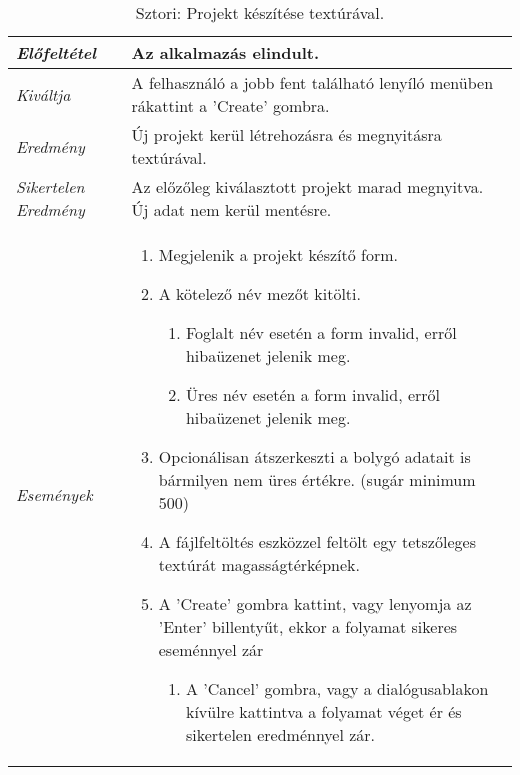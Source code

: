 \begin{table}[H]
	\centering
	\begin{tabular}{ | m{} | m{} | }
		\hline
		\emph{Előfeltétel} & Az alkalmazás elindult.  \\
		\hline
		\emph{Kiváltja} & A felhasználó a jobb fent található lenyíló menüben rákattint a 'Create' gombra. \\
		\hline
		\emph{Eredmény} & Új projekt kerül létrehozásra és megnyitásra textúrával.  \\
		\hline
		\emph{Sikertelen Eredmény} & Az előzőleg kiválasztott projekt marad megnyitva. Új adat nem kerül mentésre.  \\
		\hline
		\hline
		\emph{Események} &

		\begin{enumerate}[itemsep=-1ex]
			\item Megjelenik a projekt készítő form.
			\item A kötelező név mezőt kitölti.
			\begin{enumerate}[itemsep=-1ex]
				\item Foglalt név esetén a form invalid, erről hibaüzenet jelenik meg.
				\item Üres név esetén a form invalid, erről hibaüzenet jelenik meg.
			\end{enumerate}
			\item Opcionálisan átszerkeszti a bolygó adatait is bármilyen nem üres értékre. (sugár minimum 500)
			\item A fájlfeltöltés eszközzel feltölt egy tetszőleges textúrát magasságtérképnek.
			\item A 'Create' gombra kattint, vagy lenyomja az 'Enter' billentyűt, ekkor a folyamat sikeres eseménnyel zár
			\begin{enumerate}[itemsep=-1ex]
				\item A 'Cancel' gombra, vagy a dialógusablakon kívülre kattintva a folyamat véget ér és sikertelen eredménnyel zár.
			\end{enumerate}
		\end{enumerate}

		\\
		\hline
	\end{tabular}
	\caption{Sztori: Projekt készítése textúrával.}
	\label{tab:story-project-create-texture}
\end{table}

